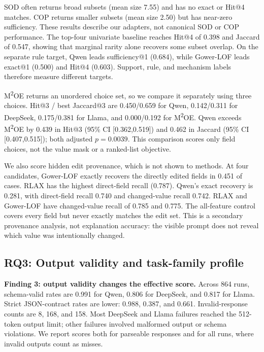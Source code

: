 \documentclass[conference]{IEEEtran}
\begin{document}
SOD often returns broad subsets (mean size 7.55) and has no exact or Hit@4 matches. COP returns smaller subsets (mean size 2.50) but has near-zero sufficiency. These results describe our adapters, not canonical SOD or COP performance. The top-four univariate baseline reaches Hit@4 of 0.398 and Jaccard of 0.547, showing that marginal rarity alone recovers some subset overlap. On the separate rule target, Qwen leads sufficiency@1 (0.684), while Gower-LOF leads exact@1 (0.500) and Hit@4 (0.603). Support, rule, and mechanism labels therefore measure different targets.

M\textsuperscript{2}OE returns an unordered choice set, so we compare it separately using three choices. Hit@3 / best Jaccard@3 are 0.450/0.659 for Qwen, 0.142/0.311 for DeepSeek, 0.175/0.381 for Llama, and 0.000/0.192 for M\textsuperscript{2}OE. Qwen exceeds M\textsuperscript{2}OE by 0.439 in Hit@3 (95\% CI [0.362,0.519]) and 0.462 in Jaccard (95\% CI [0.407,0.515]); both adjusted $p=0.0039$. This comparison scores only field choices, not the value mask or a ranked-list objective.

We also score hidden edit provenance, which is not shown to methods. At four candidates, Gower-LOF exactly recovers the directly edited fields in 0.451 of cases. RLAX has the highest direct-field recall (0.787). Qwen's exact recovery is 0.281, with direct-field recall 0.740 and changed-value recall 0.742. RLAX and Gower-LOF have changed-value recall of 0.785 and 0.775. The all-feature control covers every field but never exactly matches the edit set. This is a secondary provenance analysis, not explanation accuracy: the visible prompt does not reveal which value was intentionally changed.

\subsection{RQ3: Output validity and task-family profile}
\textbf{Finding 3: output validity changes the effective score.} Across 864 runs, schema-valid rates are 0.991 for Qwen, 0.806 for DeepSeek, and 0.817 for Llama. Strict JSON-contract rates are lower: 0.988, 0.387, and 0.661. Invalid-response counts are 8, 168, and 158. Most DeepSeek and Llama failures reached the 512-token output limit; other failures involved malformed output or schema violations. We report scores both for parseable responses and for all runs, where invalid outputs count as misses.
\end{document}
